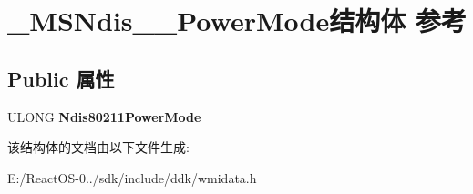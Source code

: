 \hypertarget{struct___m_s_ndis__80211___power_mode}{}\section{\+\_\+\+M\+S\+Ndis\+\_\+\_\+\+Power\+Mode结构体 参考}
\label{struct___m_s_ndis__80211___power_mode}
\subsection*{Public 属性}
\begin{DoxyCompactItemize}
\item 
\mbox{\label{struct___m_s_ndis__80211___power_mode_aaa9653d596296f5bd699f790fc29927b}} 
U\+L\+O\+NG {\bfseries Ndis80211\+Power\+Mode}
\end{DoxyCompactItemize}


该结构体的文档由以下文件生成\+:\begin{DoxyCompactItemize}
\item 
E\+:/\+React\+O\+S-\/0../sdk/include/ddk/wmidata.\+h\end{DoxyCompactItemize}

